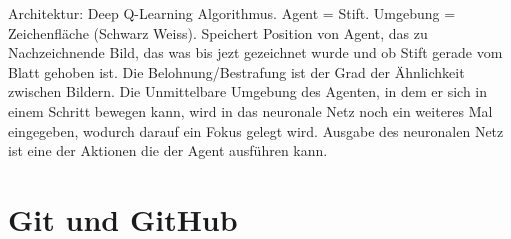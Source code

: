 Architektur: Deep Q-Learning Algorithmus.
Agent = Stift. Umgebung = Zeichenfläche (Schwarz Weiss). Speichert Position von
Agent, das zu Nachzeichnende Bild, das was bis jezt gezeichnet wurde und ob
Stift gerade vom Blatt gehoben ist. Die Belohnung/Bestrafung ist der Grad der
Ähnlichkeit zwischen Bildern. Die Unmittelbare Umgebung des Agenten, in dem er
sich in einem Schritt bewegen kann, wird in das neuronale Netz noch ein weiteres
Mal eingegeben, wodurch darauf ein Fokus gelegt wird. Ausgabe des neuronalen
Netz ist eine der Aktionen die der Agent ausführen kann.



\section{Git und GitHub}
\label{chap:t_git}



